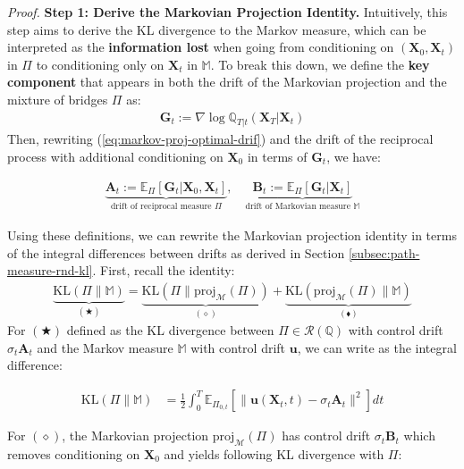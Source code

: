 \documentclass{article}
\begin{document}
\textit{Proof.} \textbf{Step 1: Derive the Markovian Projection Identity.}
Intuitively, this step aims to derive the KL divergence to the Markov measure, which can be interpreted as the \textbf{information lost} when going from conditioning on $(\boldsymbol{X}_0, \boldsymbol{X}_t)$ in $\Pi$ to conditioning only on $\boldsymbol{X}_t$ in $\mathbb{M}$. To break this down, we define the \textbf{key component} that appears in both the drift of the Markovian projection and the mixture of bridges $\Pi$ as:
\begin{align}
    \boldsymbol{G}_t:=\nabla \log \mathbb{Q}_{T|t}(\boldsymbol{X}_T|\boldsymbol{X}_t)
\end{align}
Then, rewriting (\ref{eq:markov-proj-optimal-drif}) and the drift of the reciprocal process with additional conditioning on $\boldsymbol{X}_0$ in terms of $\boldsymbol{G}_t$, we have:
\begin{small}
\begin{align}
    \underbrace{\boldsymbol{A}_t:= \mathbb{E}_{\Pi}\left[\boldsymbol{G}_t|\boldsymbol{X}_0,\boldsymbol{X}_t\right]}_{\text{drift of reciprocal measure }\Pi}, \quad \underbrace{\boldsymbol{B}_t:= \mathbb{E}_{\Pi}\left[\boldsymbol{G}_t|\boldsymbol{X}_t\right]}_{\text{drift of Markovian measure }\mathbb{M}}
\end{align}
\end{small}
Using these definitions, we can rewrite the Markovian projection identity in terms of the integral differences between drifts as derived in Section \ref{subsec:path-measure-rnd-kl}. First, recall the identity:
\begin{align}
    \underbrace{\text{KL}(\Pi\|\mathbb{M})}_{(\bigstar)}=\underbrace{\text{KL}(\Pi\|\text{proj}_{\mathcal{M}}(\Pi))}_{(\diamond)}+\underbrace{\text{KL}(\text{proj}_{\mathcal{M}}(\Pi)\|\mathbb{M})}_{(\blacklozenge)}\label{eq:pythag-proof6}
\end{align}
For $(\bigstar)$ defined as the KL divergence between $\Pi\in \mathcal{R}(\mathbb{Q})$ with control drift $\sigma_t\boldsymbol{A}_t$ and the Markov measure $\mathbb{M}$ with control drift $\boldsymbol{u}$, we can write as the integral difference:
\begin{small}
\begin{align}
    \text{KL}(\Pi\|\mathbb{M})&=\frac{1}{2}\int_0^T\mathbb{E}_{\Pi_{0,t}}\left[\|\boldsymbol{u}(\boldsymbol{X}_t,t)-\sigma_t\boldsymbol{A}_t\|^2\right]dt
\end{align}
\end{small}
For $(\diamond)$, the Markovian projection $\text{proj}_{\mathcal{M}}(\Pi)$ has control drift $\sigma_t\boldsymbol{B}_t$ which removes conditioning on $\boldsymbol{X}_0$ and yields following KL divergence with $\Pi$:
\end{document}
